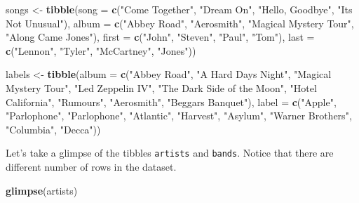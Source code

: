 \documentclass[
]{book}
\newenvironment{Shaded}{\begin{snugshade}}{\end{snugshade}}
\newcommand{\AttributeTok}[1]{\textcolor[rgb]{0.13,0.29,0.53}{#1}}
\newcommand{\FunctionTok}[1]{\textcolor[rgb]{0.13,0.29,0.53}{\textbf{#1}}}
\newcommand{\NormalTok}[1]{#1}
\newcommand{\OtherTok}[1]{\textcolor[rgb]{0.56,0.35,0.01}{#1}}
\newcommand{\StringTok}[1]{\textcolor[rgb]{0.31,0.60,0.02}{#1}}
\begin{document}
\begin{Shaded}
\begin{Highlighting}[]
\NormalTok{songs }\OtherTok{\textless{}{-}} \FunctionTok{tibble}\NormalTok{(}\AttributeTok{song =} \FunctionTok{c}\NormalTok{(}\StringTok{"Come Together"}\NormalTok{, }\StringTok{"Dream On"}\NormalTok{, }\StringTok{"Hello, Goodbye"}\NormalTok{, }\StringTok{"It\textquotesingle{}s Not Unusual"}\NormalTok{),}
                \AttributeTok{album  =} \FunctionTok{c}\NormalTok{(}\StringTok{"Abbey Road"}\NormalTok{, }\StringTok{"Aerosmith"}\NormalTok{, }\StringTok{"Magical Mystery Tour"}\NormalTok{, }\StringTok{"Along Came Jones"}\NormalTok{), }
                \AttributeTok{first =} \FunctionTok{c}\NormalTok{(}\StringTok{"John"}\NormalTok{, }\StringTok{"Steven"}\NormalTok{, }\StringTok{"Paul"}\NormalTok{, }\StringTok{"Tom"}\NormalTok{), }
                \AttributeTok{last =} \FunctionTok{c}\NormalTok{(}\StringTok{"Lennon"}\NormalTok{, }\StringTok{"Tyler"}\NormalTok{, }\StringTok{"McCartney"}\NormalTok{, }\StringTok{"Jones"}\NormalTok{))}


\NormalTok{labels }\OtherTok{\textless{}{-}} \FunctionTok{tibble}\NormalTok{(}\AttributeTok{album =} \FunctionTok{c}\NormalTok{(}\StringTok{"Abbey Road"}\NormalTok{, }\StringTok{"A Hard Days Night"}\NormalTok{, }\StringTok{"Magical Mystery Tour"}\NormalTok{,}
                           \StringTok{"Led Zeppelin IV"}\NormalTok{, }\StringTok{"The Dark Side of the Moon"}\NormalTok{, }\StringTok{"Hotel California"}\NormalTok{, }
                           \StringTok{"Rumours"}\NormalTok{, }\StringTok{"Aerosmith"}\NormalTok{, }\StringTok{"Beggar\textquotesingle{}s Banquet"}\NormalTok{), }
                 \AttributeTok{label =} \FunctionTok{c}\NormalTok{(}\StringTok{"Apple"}\NormalTok{, }\StringTok{"Parlophone"}\NormalTok{, }\StringTok{"Parlophone"}\NormalTok{, }\StringTok{"Atlantic"}\NormalTok{, }\StringTok{"Harvest"}\NormalTok{,}
                           \StringTok{"Asylum"}\NormalTok{, }\StringTok{"Warner Brothers"}\NormalTok{, }\StringTok{"Columbia"}\NormalTok{, }\StringTok{"Decca"}\NormalTok{))}
\end{Highlighting}
\end{Shaded}

Let's take a glimpse of the tibbles \texttt{artists} and \texttt{bands}. Notice that there are different number of rows in the dataset.

\begin{Shaded}
\begin{Highlighting}[]
\FunctionTok{glimpse}\NormalTok{(artists)}
\end{Highlighting}
\end{Shaded}
\end{document}
